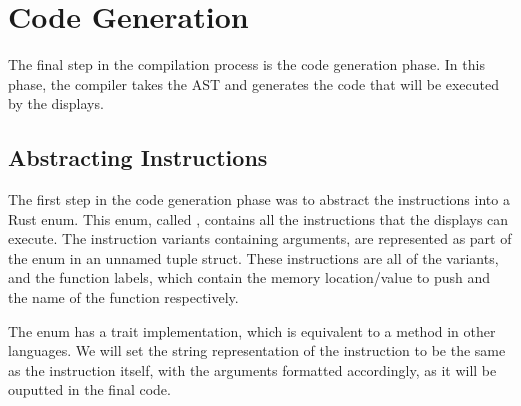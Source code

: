 \section{Code Generation}

The final step in the compilation process is the code generation phase. In this phase, the compiler takes the AST and generates the  code that will be executed by the  displays.

\subsection{Abstracting Instructions}

The first step in the code generation phase was to abstract the 
instructions into a Rust enum. This enum, called , contains
all the instructions that the  displays can execute. The
instruction variants containing arguments, are represented as part of the enum
in an unnamed tuple struct. These instructions are all of the 
variants, and the function labels, which contain the memory location/value to
push and the name of the function respectively.

The  enum has a  trait implementation, which is
equivalent to a  method in other languages. We will set the
string representation of the instruction to be the same as the 
instruction itself, with the arguments formatted accordingly, as it will be
ouputted in the final  code.
